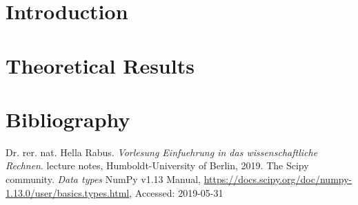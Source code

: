 \documentclass[refman]{scrartcl}
\theoremstyle{definition}
\begin{document}
%
%

\newpage
%
%
\section{Introduction}
%

%
\section{Theoretical Results}
%


%
%


%

%
\newpage
\section{Bibliography}
\begin{thebibliography}{9}
    Dr. rer. nat. Hella Rabus. 
    \textit{Vorlesung Einfuehrung in das wissenschaftliche Rechnen}. 
    lecture notes, Humboldt-University of Berlin, 2019.
    The Scipy community.
    \textit{Data types}
    NumPy v1.13 Manual, \url{https://docs.scipy.org/doc/numpy-1.13.0/user/basics.types.html}, Accessed: 2019-05-31
\end{thebibliography}
\end{document}
